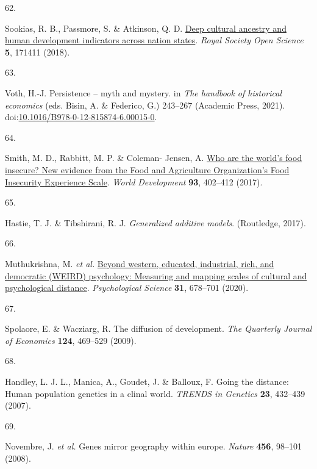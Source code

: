 \documentclass[
  man,floatsintext]{apa6}
\newlength{\cslhangindent}
\newlength{\csllabelwidth}
\newlength{\cslentryspacingunit} %
\newenvironment{CSLReferences}[2] %
 {%
  \setlength{\parindent}{0pt}
  \ifodd #1
  \let\oldpar\par
  \def\par{\hangindent=\cslhangindent\oldpar}
  \fi
  \setlength{\parskip}{#2\cslentryspacingunit}
 }%
 {}
\newcommand{\CSLLeftMargin}[1]{\parbox[t]{\csllabelwidth}{#1}}
\newcommand{\CSLRightInline}[1]{\parbox[t]{\linewidth - \csllabelwidth}{#1}\break}
\begin{document}
\begin{CSLReferences}{0}{0}
\leavevmode{}%
\CSLLeftMargin{62. }%
\CSLRightInline{Sookias, R. B., Passmore, S. \& Atkinson, Q. D. \href{https://doi.org/10.1098/rsos.171411}{Deep cultural ancestry and human development indicators across nation states}. \emph{Royal Society Open Science} \textbf{5}, 171411 (2018).}

\leavevmode{}%
\CSLLeftMargin{63. }%
\CSLRightInline{Voth, H.-J. Persistence -- myth and mystery. in \emph{The handbook of historical economics} (eds. Bisin, A. \& Federico, G.) 243--267 (Academic Press, 2021). doi:\href{https://doi.org/10.1016/B978-0-12-815874-6.00015-0}{10.1016/B978-0-12-815874-6.00015-0}.}

\leavevmode{}%
\CSLLeftMargin{64. }%
\CSLRightInline{Smith, M. D., Rabbitt, M. P. \& Coleman- Jensen, A. \href{https://doi.org/10.1016/j.worlddev.2017.01.006}{Who are the world's food insecure? New evidence from the {F}ood and {A}griculture {O}rganization's {F}ood {I}nsecurity {E}xperience {S}cale}. \emph{World Development} \textbf{93}, 402--412 (2017).}

\leavevmode{}%
\CSLLeftMargin{65. }%
\CSLRightInline{Hastie, T. J. \& Tibshirani, R. J. \emph{Generalized additive models}. (Routledge, 2017).}

\leavevmode{}%
\CSLLeftMargin{66. }%
\CSLRightInline{Muthukrishna, M. \emph{et al.} \href{https://doi.org/10.1177/0956797620916782}{Beyond western, educated, industrial, rich, and democratic (WEIRD) psychology: Measuring and mapping scales of cultural and psychological distance}. \emph{Psychological Science} \textbf{31}, 678--701 (2020).}

\leavevmode{}%
\CSLLeftMargin{67. }%
\CSLRightInline{Spolaore, E. \& Wacziarg, R. The diffusion of development. \emph{The Quarterly Journal of Economics} \textbf{124}, 469--529 (2009).}

\leavevmode{}%
\CSLLeftMargin{68. }%
\CSLRightInline{Handley, L. J. L., Manica, A., Goudet, J. \& Balloux, F. Going the distance: Human population genetics in a clinal world. \emph{TRENDS in Genetics} \textbf{23}, 432--439 (2007).}

\leavevmode{}%
\CSLLeftMargin{69. }%
\CSLRightInline{Novembre, J. \emph{et al.} Genes mirror geography within europe. \emph{Nature} \textbf{456}, 98--101 (2008).}


\end{CSLReferences}
\end{document}
